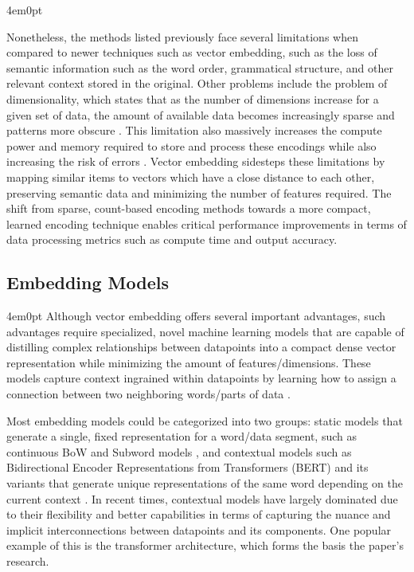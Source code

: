 \begin{indentedblock}{4em}{0pt}
			
			Nonetheless, the methods listed previously face several limitations when compared to newer techniques such as vector embedding, such as the loss of semantic information such as the word order, grammatical structure, and other relevant context stored in the original. Other problems include the problem of dimensionality, which states that as the number of dimensions increase for a given set of data, the amount of available data becomes increasingly sparse and patterns more obscure \parencite{data_mining_robert}. This limitation also massively increases the compute power and memory required to store and process these encodings while also increasing the risk of errors \parencite{problem_of_dimensionality_trunk}. Vector embedding sidesteps these limitations by mapping similar items to vectors which have a close distance to each other, preserving semantic data and minimizing the number of features required. The shift from sparse, count-based encoding methods towards a more compact, learned encoding technique enables critical performance improvements in terms of data processing metrics such as compute time and output accuracy. 
			
		\end{indentedblock}
	\subsection{Embedding Models}
		\begin{indentedblock}{4em}{0pt}
			Although vector embedding offers several important advantages, such advantages require specialized, novel machine learning models that are capable of distilling complex relationships between datapoints into a compact dense vector representation while minimizing the amount of features/dimensions. These models capture context ingrained within datapoints by learning how to assign a connection between two neighboring words/parts of data \parencite[Chapter~4.1]{natural_language_processing_tran}. 
			
			
			Most embedding models could be categorized into two groups: static models that generate a single, fixed representation for a word/data segment, such as continuous BoW and Subword models \parencite{embedding_models_wang}, and contextual models such as Bidirectional Encoder Representations from Transformers (BERT) and its variants that generate unique representations of the same word depending on the current context \parencites{embedding_models_liu}{bert_devlin}. In recent times, contextual models have largely dominated due to their flexibility and better capabilities in terms of capturing the nuance and implicit interconnections between datapoints and its components. One popular example of this is the transformer architecture, which forms the basis the paper's research.
		\end{indentedblock}


